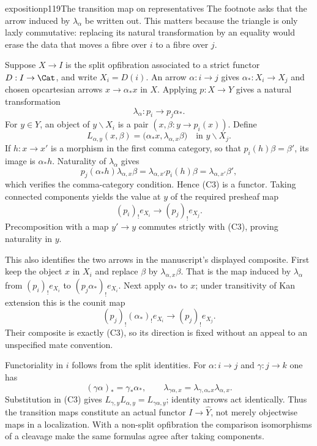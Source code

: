 \begin{dcomment}{exposition}{p119}{The transition map on representatives}
The footnote asks that the arrow induced by $\lambda_\alpha$ be written out. This matters because the triangle is only laxly commutative: replacing its natural transformation by an equality would erase the data that moves a fibre over $i$ to a fibre over $j$.

Suppose $X\to I$ is the split opfibration associated to a strict functor $D:I\to\Cat$, and write $X_i=D(i)$. An arrow $\alpha:i\to j$ gives $\alpha_*:X_i\to X_j$ and chosen opcartesian arrows $x\to\alpha_*x$ in $X$. Applying $p:X\to Y$ gives a natural transformation
\[
 \lambda_\alpha:p_i\longrightarrow p_j\alpha_*.
\]
For $y\in Y$, an object of $y\backslash X_i$ is a pair $(x,\beta:y\to p_i(x))$. Define
\[
 L_{\alpha,y}(x,\beta)
   =\bigl(\alpha_*x,\lambda_{\alpha,x}\beta\bigr)
     \quad\text{in }y\backslash X_j.                 \tag{C3}
\]
If $h:x\to x'$ is a morphism in the first comma category, so that $p_i(h)\beta=\beta'$, its image is $\alpha_*h$. Naturality of $\lambda_\alpha$ gives
\[
 p_j(\alpha_*h)\lambda_{\alpha,x}\beta
 =\lambda_{\alpha,x'}p_i(h)\beta
 =\lambda_{\alpha,x'}\beta',
\]
which verifies the comma-category condition. Hence (C3) is a functor. Taking connected components yields the value at $y$ of the required presheaf map
\[
 (p_i)_!e_{X_i}\longrightarrow(p_j)_!e_{X_j}.
\]
Precomposition with a map $y'\to y$ commutes strictly with (C3), proving naturality in $y$.

This also identifies the two arrows in the manuscript's displayed composite. First keep the object $x$ in $X_i$ and replace $\beta$ by $\lambda_{\alpha,x}\beta$. That is the map induced by $\lambda_\alpha$ from $(p_i)_!e_{X_i}$ to $(p_j\alpha_*)_!e_{X_i}$. Next apply $\alpha_*$ to $x$; under transitivity of Kan extension this is the counit map
\[
 (p_j)_!(\alpha_*)_!e_{X_i}\longrightarrow(p_j)_!e_{X_j}.
\]
Their composite is exactly (C3), so its direction is fixed without an appeal to an unspecified mate convention.

Functoriality in $i$ follows from the split identities. For $\alpha:i\to j$ and $\gamma:j\to k$ one has
\[
 (\gamma\alpha)_*=\gamma_*\alpha_*,
 \qquad
 \lambda_{\gamma\alpha,x}
 =\lambda_{\gamma,\alpha_*x}\lambda_{\alpha,x}.
\]
Substitution in (C3) gives $L_{\gamma,y}L_{\alpha,y}=L_{\gamma\alpha,y}$; identity arrows act identically. Thus the transition maps constitute an actual functor $I\to\widehat Y$, not merely objectwise maps in a localization. With a non-split opfibration the comparison isomorphisms of a cleavage make the same formulas agree after taking components.


\end{dcomment}

